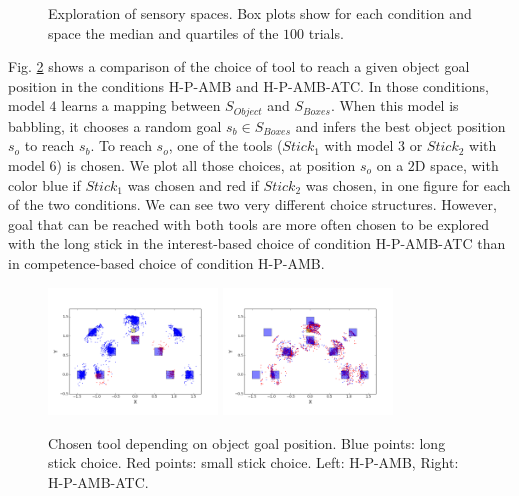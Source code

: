 \documentclass[10pt,letterpaper]{article}
\begin{document}
\begin{figure}[ht]
		\caption{Exploration of sensory spaces. Box plots show for each condition and space the median and quartiles of the $100$ trials.}
		\label{res_explo}
	\end{figure}

	Fig. \ref{res_choice} shows a comparison of the choice of tool to reach a given object goal position in the conditions H-P-AMB and H-P-AMB-ATC.
	In those conditions, model $4$ learns a mapping between $S_{Object}$ and $S_{Boxes}$. 
	When this model is babbling, it chooses a random goal $s_b \in S_{Boxes}$ and infers the best object position $s_o$ to reach $s_b$.
	To reach $s_o$, one of the tools ($Stick_1$ with model $3$ or $Stick_2$ with model $6$) is chosen. 
	We plot all those choices, at position $s_o$ on a $2$D space, with color blue if $Stick_1$ was chosen and red if $Stick_2$ was chosen, in one figure for each of the two conditions.
	We can see two very different choice structures.
	However, goal that can be reached with both tools are more often chosen to be explored with the long stick in the interest-based choice of condition H-P-AMB-ATC than in competence-based choice of condition H-P-AMB.
	
	\begin{figure}[ht]
		\centering
		\includegraphics[width=4.5cm]{./include/H-RGB-P-AMB-log9-choice_mod4.png}
		\hspace{-0.6cm}
		\includegraphics[width=4.5cm]{./include/H-RGB-P-AMB-PGITC-log3-choice_mod4.png}
		\caption{Chosen tool depending on object goal position. Blue points: long stick choice. Red points: small stick choice. Left: H-P-AMB, Right: H-P-AMB-ATC.}
		\label{res_choice}
	\end{figure}
	
\end{document}
